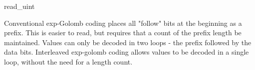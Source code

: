 \begin{pseudo}{read\_uint}{}
  \bsEND
\bsEND
{}

\end{pseudo}


\begin{informative}
Conventional exp-Golomb coding places all "follow" bits at the beginning as a prefix. This is
easier to read, but requires that a count of the prefix length be maintained. Values can only
be decoded in two loops - the prefix followed by the data bits. Interleaved exp-golomb 
coding allows values to be decoded in a single loop, without the need for a length count.
\end{informative}
